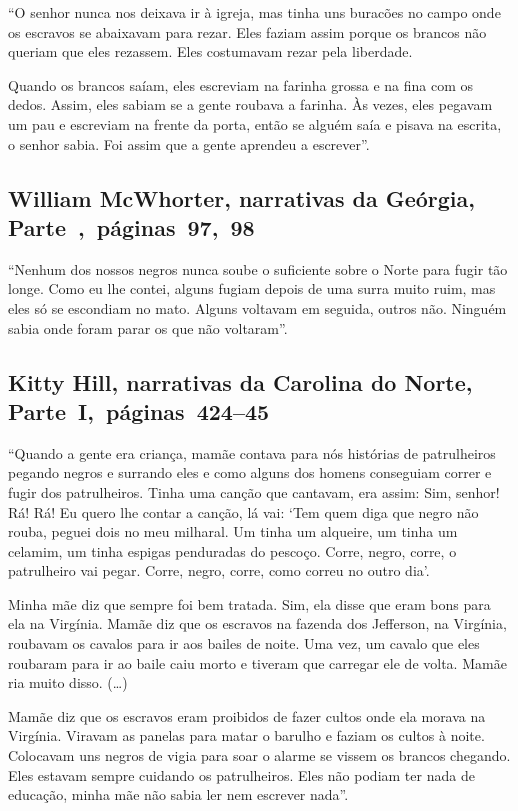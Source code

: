 ``O senhor nunca nos deixava ir à igreja, mas tinha uns buracões no
campo onde os escravos se abaixavam para rezar. Eles faziam assim porque
os brancos não queriam que eles rezassem. Eles costumavam rezar pela
liberdade.

Quando os brancos saíam, eles escreviam na farinha grossa e na fina com
os dedos. Assim, eles sabiam se a gente roubava a farinha. Às vezes,
eles pegavam um pau e escreviam na frente da porta, então se alguém saía
e pisava na escrita, o senhor sabia. Foi assim que a gente aprendeu a
escrever''.

\subsection{William McWhorter, narrativas da Geórgia, Parte~,~páginas~97,~98}
\label{ref192}

``Nenhum dos nossos negros nunca soube o suficiente sobre o Norte para
fugir tão longe. Como eu lhe contei, alguns fugiam depois de uma surra
muito ruim, mas eles só se escondiam no mato. Alguns voltavam em
seguida, outros não. Ninguém sabia onde foram parar os que não
voltaram''.



\subsection{Kitty Hill, narrativas da Carolina do Norte, Parte~I,~páginas~424--45}
\label{ref146}

``Quando a gente era criança, mamãe contava para nós histórias de
patrulheiros pegando negros e surrando eles e como alguns dos homens
conseguiam correr e fugir dos patrulheiros. Tinha uma canção que
cantavam, era assim: Sim, senhor! Rá! Rá! Eu quero lhe contar a canção,
lá vai: `Tem quem diga que negro não rouba, peguei dois no meu milharal.
Um tinha um alqueire, um tinha um celamim, um tinha espigas penduradas
do pescoço. Corre, negro, corre, o patrulheiro vai pegar. Corre, negro,
corre, como correu no outro dia'.

Minha mãe diz que sempre foi bem tratada. Sim, ela disse que eram bons
para ela na Virgínia. Mamãe diz que os escravos na fazenda dos
Jefferson, na Virgínia, roubavam os cavalos para ir aos bailes de noite.
Uma vez, um cavalo que eles roubaram para ir ao baile caiu morto e
tiveram que carregar ele de volta. Mamãe ria muito disso. (\ldots{})

Mamãe diz que os escravos eram proibidos de fazer cultos onde ela morava
na Virgínia. Viravam as panelas para matar o barulho e faziam os cultos
à noite. Colocavam uns negros de vigia para soar o alarme se vissem os
brancos chegando. Eles estavam sempre cuidando os patrulheiros. Eles não
podiam ter nada de educação, minha mãe não sabia ler nem escrever
nada''.

